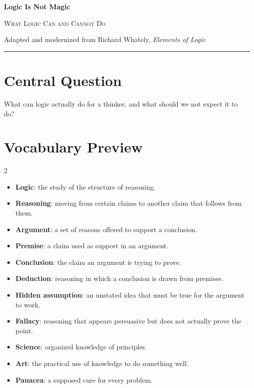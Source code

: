 \documentclass[12pt]{article}
\begin{document}
\begin{center}
{\LARGE\bfseries Logic Is Not Magic}\par\vspace{0.25em}
{\large\scshape What Logic Can and Cannot Do}\par\vspace{0.5em}
{Adapted and modernized from Richard Whately, \textit{Elements of Logic}}\par\vspace{0.6em}
\rule{0.82\textwidth}{0.4pt}
\end{center}

\section*{Central Question}
What can logic actually do for a thinker, and what should we not expect it to do?

\section*{Vocabulary Preview}
\begin{multicols}{2}
\begin{itemize}[leftmargin=*, itemsep=0.18em]
\item \textbf{Logic}: the study of the structure of reasoning.
\item \textbf{Reasoning}: moving from certain claims to another claim that follows from them.
\item \textbf{Argument}: a set of reasons offered to support a conclusion.
\item \textbf{Premise}: a claim used as support in an argument.
\item \textbf{Conclusion}: the claim an argument is trying to prove.
\item \textbf{Deduction}: reasoning in which a conclusion is drawn from premises.
\item \textbf{Hidden assumption}: an unstated idea that must be true for the argument to work.
\item \textbf{Fallacy}: reasoning that appears persuasive but does not actually prove the point.
\item \textbf{Science}: organized knowledge of principles.
\item \textbf{Art}: the practical use of knowledge to do something well.
\item \textbf{Panacea}: a supposed cure for every problem.
\end{itemize}
\end{multicols}
\end{document}
